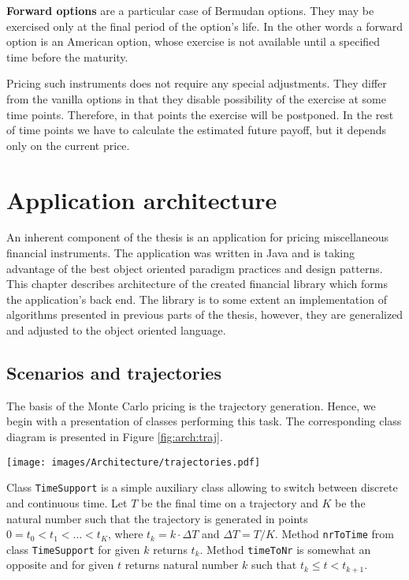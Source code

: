 \documentclass[a4paper,11pt, twoside]{book}
\theoremstyle{definition}
\theoremstyle{remark}
\begin{document}
\textbf{Forward options} are a particular case of Bermudan options. They may be exercised only at the final period of the option's life. In the other words a forward option is an American option, whose exercise is not available until a specified time before the maturity.

Pricing such instruments does not require any special adjustments. They differ from the vanilla options in that they disable possibility of the exercise at some time points. Therefore, in that points the exercise will be postponed. In the rest of time points we have to calculate the estimated future payoff, but it depends only on the current price.



\chapter{Application architecture}
An inherent component of the thesis is an application for pricing miscellaneous financial instruments. The application was written in Java and is taking advantage of the best object oriented paradigm practices and design patterns. This chapter describes architecture of the created financial library which forms the application's back end. The library is to some extent an implementation of algorithms presented in previous parts of the thesis, however, they are generalized and adjusted to the object oriented language.

\section{Scenarios and trajectories}
The basis of the Monte Carlo pricing is the trajectory generation. Hence, we begin with a presentation of classes performing this task. The corresponding class diagram is presented in Figure \ref{fig:arch:traj}.

\begin{sidewaysfigure}
\centering
 \texttt{[image: images/Architecture/trajectories.pdf]}
\caption{Class diagram presenting classes designated for scenario generation.}
\label{fig:arch:traj}
\end{sidewaysfigure}

Class \texttt{TimeSupport} is a simple auxiliary class allowing to switch between discrete and continuous time. Let $T$ be the final time on a trajectory and $K$ be the natural number such that the trajectory is generated in points $0 = t_0 < t_1 < \ldots < t_K$, where $t_k = k \cdot \Delta T$ and $\Delta T = T / K$. Method \texttt{nrToTime} from class \texttt{TimeSupport} for given $k$ returns $t_k$. Method \texttt{timeToNr} is somewhat an opposite and for given $t$ returns natural number $k$ such that $t_k \leq t < t_{k+1}$. 
\end{document}
